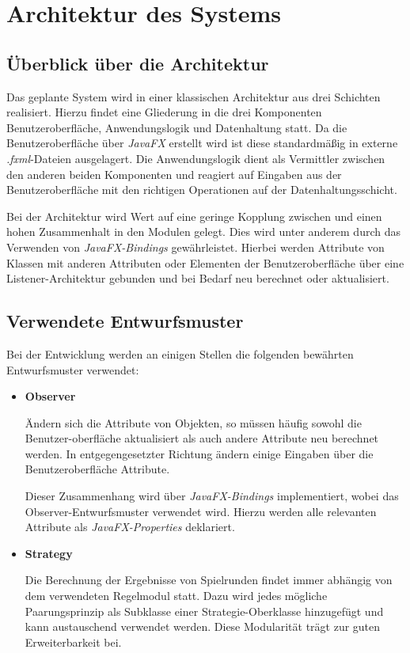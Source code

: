 \documentclass[11pt]{article}
\begin{document}
\section{Architektur des Systems}

\subsection{Überblick über die Architektur}

Das geplante System wird in einer klassischen Architektur aus drei Schichten realisiert. Hierzu findet eine Gliederung in die drei Komponenten Benutzeroberfläche, Anwendungslogik und Datenhaltung statt. Da die Benutzeroberfläche über \textit{JavaFX} erstellt wird ist diese standardmäßig in externe \textit{.fxml}-Dateien ausgelagert. Die Anwendungslogik dient als Vermittler zwischen den anderen beiden Komponenten und reagiert auf Eingaben aus der Benutzeroberfläche mit den richtigen Operationen auf der Datenhaltungsschicht.

Bei der Architektur wird Wert auf eine geringe Kopplung zwischen und einen hohen Zusammenhalt in den Modulen gelegt. Dies wird unter anderem durch das Verwenden von \textit{JavaFX-Bindings} gewährleistet. Hierbei werden Attribute von Klassen mit anderen Attributen oder Elementen der Benutzeroberfläche über eine Listener-Architektur gebunden und bei Bedarf neu berechnet oder aktualisiert.

\subsection{Verwendete Entwurfsmuster}

Bei der Entwicklung werden an einigen Stellen die folgenden bewährten Entwurfsmuster verwendet:
\begin{itemize}
	\item[] \textbf{Observer} \hfill
	
	\leftskip 1cm
	Ändern sich die Attribute von Objekten, so müssen häufig sowohl die Benutzer-oberfläche aktualisiert als auch andere Attribute neu berechnet werden. In entgegengesetzter Richtung ändern einige Eingaben über die Benutzeroberfläche Attribute.
	
	Dieser Zusammenhang wird über \textit{JavaFX-Bindings} implementiert, wobei das Observer-Entwurfsmuster verwendet wird. Hierzu werden alle relevanten Attribute als \textit{JavaFX-Properties} deklariert.

	\leftskip 0cm
	\item[] \textbf{Strategy} \hfill
	
	\leftskip 1cm
	Die Berechnung der Ergebnisse von Spielrunden findet immer abhängig von dem verwendeten Regelmodul statt. Dazu wird jedes mögliche Paarungsprinzip als Subklasse einer Strategie-Oberklasse hinzugefügt und kann austauschend verwendet werden. Diese Modularität trägt zur guten Erweiterbarkeit bei.
\end{itemize}
\end{document}
